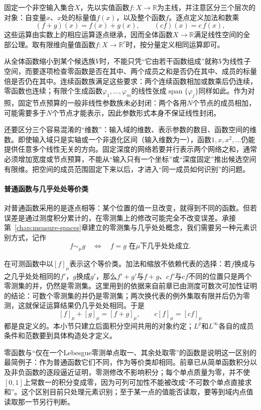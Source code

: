 固定一个非空输入集合$X$，先以实值函数$f:X\to\mathbb R$为主线，并注意区分三个层次的对象：自变量$x$、$x$处的标量值$f(x)$，以及整个函数$f$。逐点定义加法和数乘
\[
  (f+g)(x)=f(x)+g(x),\qquad (cf)(x)=c\,f(x),
\]
这些运算由实数上的相应运算逐点继承，因而全体函数$X\to\mathbb R$满足线性空间的全部公理。取有限维向量值函数$f:X\to\mathbb R^r$时，按分量定义相同运算即可。

从全体函数缩小到某个候选族$V$时，不能只凭“它由若干函数组成”就称$V$为线性子空间，而要逐项检查零函数是否在其中、两个成员之和是否仍在其中、成员的标量倍是否仍在其中。连续函数族满足这些要求：两个连续函数相加或数乘后仍连续，零函数也连续；有限个生成函数$\varphi_1,\ldots,\varphi_m$的线性张成$\operatorname{span}\{\varphi_j\}$同样如此。作为对照，固定节点预算的一般非线性参数族未必封闭：两个各用$N$个节点的成员相加，可能需要多于$N$个节点才能表示，因此参数形式本身不保证线性封闭。

还要区分三个容易混淆的“维数”：输入域的维数、表示参数的数目、函数空间的维数。即使输入域只是实轴或一个非退化区间（输入维数为一），函数$1,x,x^2,\ldots$仍能提供任意多个线性无关的方向。固定深度的网络若要并行表示两个网络之和，通常必须增加宽度或节点预算，不能从“输入只有一个坐标”或“深度固定”推出候选空间有限维。把空间的成员范围固定下来以后，才进入“同一成员如何识别”的问题。

\paragraph{普通函数与几乎处处等价类}

对普通函数采用的是逐点相等：某个位置的值一旦改变，就得到不同的函数。但若误差是通过测度积分累计的，在零测集上的修改可能完全不改变误差。承接第~\ref{chap:measure-spaces}章建立的零测集与几乎处处概念，我们需要另一种元素识别方式，记作
\[
  f\sim_\mu g\quad\Longleftrightarrow\quad f=g\text{ 在$\mu$下几乎处处成立}.
\]

在可测函数中以$[f]_\mu$表示这个等价类。加法和缩放不依赖代表的选择：若$f$换成与之几乎处处相同的$f'$，$g$换成$g'$，那么$f'+g'$与$f+g$、$cf'$与$cf$不同的位置只是两个零测集的并，仍然是零测集。这里用到的依据来自前章已由测度可数次可加性证明的结论：可数个零测集的并仍是零测集；两次换代表的例外集取有限并后仍为零测，这就保证运算结果仍几乎处处相同。于是
\[
  [f]_\mu+[g]_\mu=[f+g]_\mu,\qquad c[f]_\mu=[cf]_\mu
\]
都是良定义的。本小节只建立后面积分空间共用的对象约定；$L^p$和$L^\infty$各自的成员条件和范数要到具体构造处才定义。

零函数与“仅在一个Lebesgue零测单点取一、其余处取零”的函数是说明这一区别的最简例子：作为普通函数它们不同，作为等价类却相同。前章已从简单函数积分以及非负函数的逐段逼近证明，零测修改不影响积分；每个单点质量为零，并不使$[0,1]$上常数一的积分变成零，因为可列可加性不能被改成“不可数个单点直接求和”。这个区别目前只处理元素识别；至于某一点的值能否读取，要等到域内点值读取那一节另行判断。

